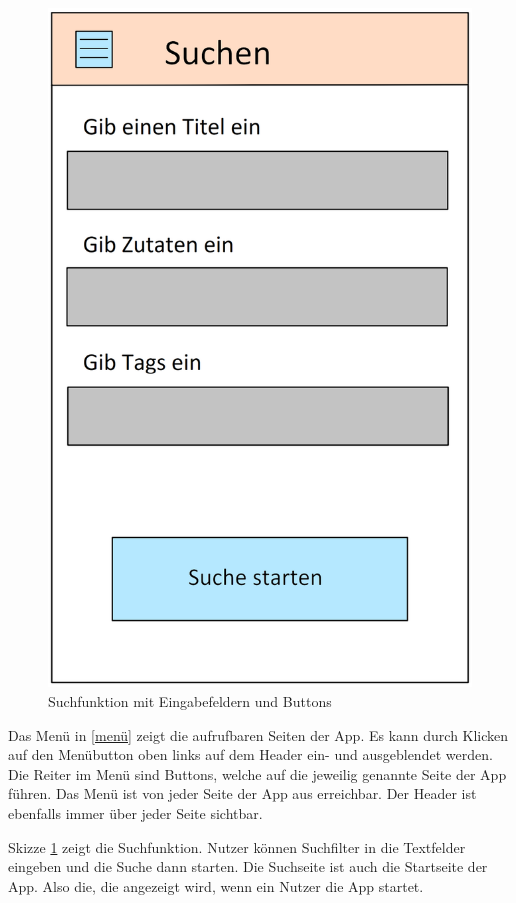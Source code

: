 \begin{figure}[H]
\begin{minipage}[c]{.5\textwidth}
			\includegraphics[width=\textwidth]{gui/suchen.png}				
		\caption{Suchfunktion mit Eingabefeldern und Buttons}
		\label{suche}
	\end{minipage}
\end{figure}


Das Menü in \ref{menü} zeigt die aufrufbaren Seiten der App. Es kann durch Klicken auf den Menübutton oben links auf dem Header ein- und ausgeblendet werden. Die Reiter im Menü sind Buttons, welche auf die jeweilig genannte Seite der App führen. Das Menü ist von jeder Seite der App aus erreichbar. Der Header ist ebenfalls immer über jeder Seite sichtbar. 

Skizze \ref{suche} zeigt die Suchfunktion. Nutzer können \gls{Suchfilter} in die Textfelder eingeben und die Suche dann starten. Die Suchseite ist auch die Startseite der App. Also die, die angezeigt wird, wenn ein Nutzer die App startet.


